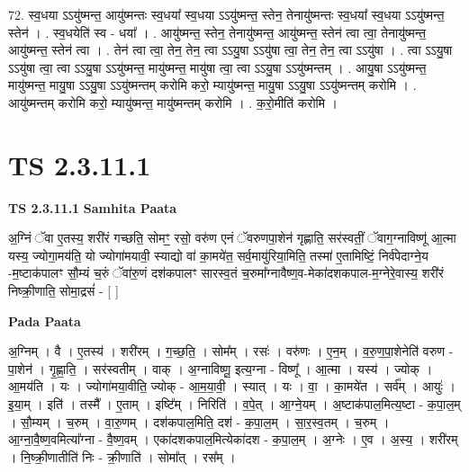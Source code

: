 \documentclass[17pt]{extarticle}
\begin{document}
72. स्व॒धया ऽऽयु॑ष्मन्त॒ आयु॑ष्मन्तः स्व॒धया᳚ स्व॒धया ऽऽयु॑ष्मन्त॒ स्तेन॒ तेनायु॑ष्मन्तः स्व॒धया᳚ स्व॒धया ऽऽयु॑ष्मन्त॒ स्तेन॑ । . स्व॒धयेति॑ स्व - धया᳚ । . आयु॑ष्मन्त॒ स्तेन॒ तेनायु॑ष्मन्त॒ आयु॑ष्मन्त॒ स्तेन॑ त्वा त्वा॒ तेनायु॑ष्मन्त॒ आयु॑ष्मन्त॒ स्तेन॑ त्वा । . तेन॑ त्वा त्वा॒ तेन॒ तेन॒ त्वा ऽऽयु॒षा ऽऽयु॑षा त्वा॒ तेन॒ तेन॒ त्वा ऽऽयु॑षा । . त्वा ऽऽयु॒षा ऽऽयु॑षा त्वा॒ त्वा ऽऽयु॒षा ऽऽयु॑ष्मन्त॒ मायु॑ष्मन्त॒ मायु॑षा त्वा॒ त्वा ऽऽयु॒षा ऽऽयु॑ष्मन्तम् । . आयु॒षा ऽऽयु॑ष्मन्त॒ मायु॑ष्मन्त॒ मायु॒षा ऽऽयु॒षा ऽऽयु॑ष्मन्तम् करोमि करो॒ म्यायु॑ष्मन्त॒ मायु॒षा ऽऽयु॒षा ऽऽयु॑ष्मन्तम् करोमि । . आयु॑ष्मन्तम् करोमि करो॒ म्यायु॑ष्मन्त॒ मायु॑ष्मन्तम् करोमि । . क॒रो॒मीति॑ करोमि । \newline
\pagebreak
{}

\section{ TS 2.3.11.1 }

\textbf{TS 2.3.11.1 } \newline
\textbf{Samhita Paata} \newline

अ॒ग्निं ॅवा ए॒तस्य॒ शरी॑रं गच्छति॒ सोमꣳ॒॒ रसो॒ वरु॑ण एनं ॅवरुणपा॒शेन॑ गृह्णाति॒ सर॑स्वतीं॒ ॅवाग॒ग्नाविष्णू॑ आ॒त्मा यस्य॒ ज्योगा॒मय॑ति॒ यो ज्योगा॑मयावी॒ स्याद्यो वा॑ का॒मये॑त॒ सर्व॒मायु॑रिया॒मिति॒ तस्मा॑ ए॒तामिष्टिं॒ निर्व॑पेदाग्ने॒य -म॒ष्टाक॑पालꣳ सौ॒म्यं च॒रुं ॅवा॑रु॒णं दश॑कपालꣳ सारस्व॒तं च॒रुमा᳚ग्नावैष्ण॒व-मेका॑दशकपाल-म॒ग्नेरे॒वास्य॒ शरी॑रं निष्क्री॒णाति॒ सोमा॒द्रसं॑ - [  ] \newline

\textbf{Pada Paata} \newline

अ॒ग्निम् । वै । ए॒तस्य॑ । शरी॑रम् । ग॒च्छ॒ति॒ । सोम᳚म् । रसः॑ । वरु॑णः । ए॒न॒म् । व॒रु॒ण॒पा॒शेनेति॑ वरुण - पा॒शेन॑ । गृ॒ह्णा॒ति॒ । सर॑स्वतीम् । वाक् । अ॒ग्नाविष्णू॒ इत्य॒ग्ना - विष्णू᳚ । आ॒त्मा । यस्य॑ । ज्योक् । आ॒मय॑ति । यः । ज्योगा॑मया॒वीति॒ ज्योक् - आ॒म॒या॒वी॒ । स्यात् । यः । वा॒ । का॒मये॑त । सर्व᳚म् । आयुः॑ । इ॒या॒म् । इति॑ । तस्मै᳚ । ए॒ताम् । इष्टि᳚म् । निरिति॑ । व॒पे॒त् । आ॒ग्ने॒यम् । अ॒ष्टाक॑पाल॒मित्य॒ष्टा - क॒पा॒ल॒म् । सौ॒म्यम् । च॒रुम् । वा॒रु॒णम् । दश॑कपाल॒मिति॒ दश॑ - क॒पा॒ल॒म् । सा॒र॒स्व॒तम् । च॒रुम् । आ॒ग्ना॒वै॒ष्ण॒वमित्या᳚ग्ना - वै॒ष्ण॒वम् । एका॑दशकपाल॒मित्येका॑दश - क॒पा॒ल॒म् । अ॒ग्नेः । ए॒व । अ॒स्य॒ । शरी॑रम् । नि॒ष्क्री॒णातीति॑ निः - क्री॒णाति॑ । सोमा᳚त् । रस᳚म् ।  \newline
\end{document}
